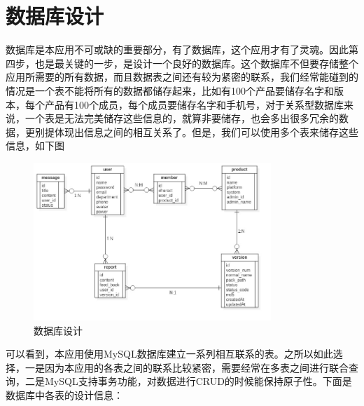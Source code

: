 \section{数据库设计}
\label{sec:database_design}
数据库是本应用不可或缺的重要部分，有了数据库，这个应用才有了灵魂。因此第四步，也是最关键的一步，是设计一个良好的数据库。这个数据库不但要存储整个应用所需要的所有数据，而且数据表之间还有较为紧密的联系，我们经常能碰到的情况是一个表不能将所有的数据都储存起来，比如有100个产品要储存名字和版本，每个产品有100个成员，每个成员要储存名字和手机号，对于关系型数据库来说，一个表是无法完美储存这些信息的，就算非要储存，也会多出很多冗余的数据，更别提体现出信息之间的相互关系了。但是，我们可以使用多个表来储存这些信息，如下图

\begin{figure}[h]
	\centering
	\includegraphics[width=0.8\textwidth]{image/UML/ERDDiagram.png}
	\caption{数据库设计}
	\label{fig:database}
\end{figure}
可以看到，本应用使用MySQL数据库建立一系列相互联系的表。之所以如此选择，一是因为本应用的各表之间的联系比较紧密，需要经常在多表之间进行联合查询，二是MySQL支持事务功能，对数据进行CRUD的时候能保持原子性。下面是数据库中各表的设计信息：
